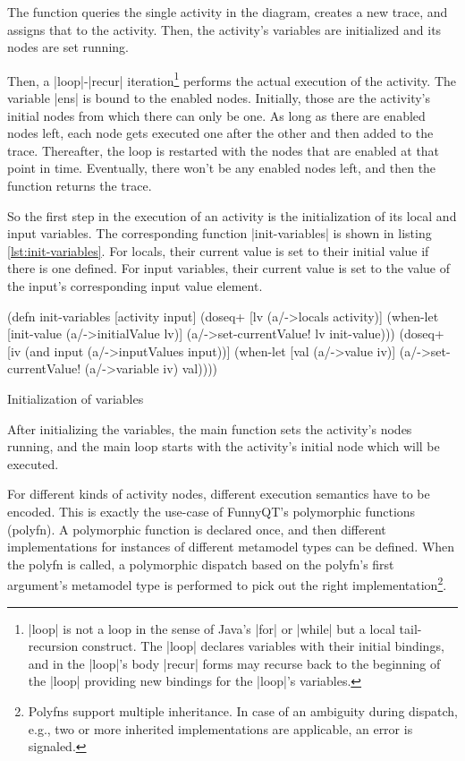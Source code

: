 \documentclass[submission]{eptcs}
\newcommand{\code}{\clojureinline}
\begin{document}
The function queries the single activity in the diagram, creates a new trace,
and assigns that to the activity.  Then, the activity's variables are
initialized and its nodes are set running.

Then, a \code|loop|-\code|recur| iteration\footnote{\code|loop| is not a loop
  in the sense of Java's \code|for| or \code|while| but a local tail-recursion
  construct.  The \code|loop| declares variables with their initial bindings,
  and in the \code|loop|'s body \code|recur| forms may recurse back to the
  beginning of the \code|loop| providing new bindings for the \code|loop|'s
  variables.} performs the actual execution of the activity.  The variable
\code|ens| is bound to the enabled nodes.  Initially, those are the activity's
initial nodes from which there can only be one.  As long as there are enabled
nodes left, each node gets executed one after the other and then added to the
trace.  Thereafter, the loop is restarted with the nodes that are enabled at
that point in time.  Eventually, there won't be any enabled nodes left, and
then the function returns the trace.

So the first step in the execution of an activity is the initialization of its
local and input variables.  The corresponding function \code|init-variables| is
shown in listing \vref{lst:init-variables}.  For locals, their current value is
set to their initial value if there is one defined.  For input variables, their
current value is set to the value of the input's corresponding input value
element.

\begin{listing}[h!tb]
\begin{clojurecode}
(defn init-variables [activity input]
  (doseq+ [lv (a/->locals activity)]
    (when-let [init-value (a/->initialValue lv)]
      (a/->set-currentValue! lv init-value)))
  (doseq+ [iv (and input (a/->inputValues input))]
    (when-let [val (a/->value iv)]
      (a/->set-currentValue! (a/->variable iv) val))))
\end{clojurecode}
\caption{Initialization of variables}
\label{lst:init-variables}
\end{listing}

After initializing the variables, the main function sets the activity's nodes
running, and the main loop starts with the activity's initial node which will
be executed.

For different kinds of activity nodes, different execution semantics have to be
encoded.  This is exactly the use-case of FunnyQT's polymorphic functions
(polyfn).  A polymorphic function is declared once, and then different
implementations for instances of different metamodel types can be defined.
When the polyfn is called, a polymorphic dispatch based on the polyfn's first
argument's metamodel type is performed to pick out the right
implementation\footnote{Polyfns support multiple inheritance.  In case of an
  ambiguity during dispatch, e.g., two or more inherited implementations are
  applicable, an error is signaled.}.
\end{document}
